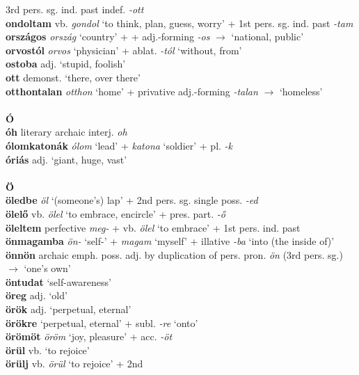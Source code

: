 \documentclass[11pt]{article}
\begin{document}
3rd pers. sg. ind. past indef. \emph{-ott} \\
\textbf{ondoltam} vb. \emph{gondol} `to think, plan, guess, worry' +
1st pers. sg. ind. past \emph{-tam} \\
\textbf{országos} \emph{ország} `country' + + adj.\hyp{}forming \emph{-os}
$\rightarrow$ `national, public' \\
\textbf{orvostól} \emph{orvos} `physician' + ablat. \emph{-tól}
`without, from' \\
\textbf{ostoba} adj. `stupid, foolish' \\
\textbf{ott} demonst. `there, over there' \\
\textbf{otthontalan} \emph{otthon} `home' + privative
adj.\hyp{}forming \emph{-talan} $\rightarrow$ `homeless' \\
\ \\
\noindent \textbf{\large Ó} \\
\textbf{óh} literary archaic interj. \emph{oh} \\
\textbf{ólomkatonák} \emph{ólom} `lead' + \emph{katona} `soldier' +
pl. \emph{-k} \\
\textbf{óriás} adj. `giant, huge, vast' \\
\ \\
\noindent \textbf{\large Ö} \\
\textbf{öledbe} \emph{öl} `(someone's) lap' + 2nd pers. sg. single
poss. \emph{-ed} \\
\textbf{ölelő} vb. \emph{ölel} `to
embrace, encircle' + pres. part. \emph{-ő} \\
\textbf{öleltem} perfective \emph{meg-} + vb. \emph{ölel} `to
embrace' + 1st pers. ind. past \\
\textbf{önmagamba} \emph{ön-} `self-' + \emph{magam} `myself' +
illative \emph{-ba} `into (the inside of)' \\
\textbf{önnön} archaic emph. poss. adj. by duplication of
pers. pron. \emph{ön} (3rd pers. sg.) $\rightarrow$ `one's own' \\
\textbf{öntudat} `self-awareness' \\
\textbf{öreg} adj. `old' \\
\textbf{örök} adj. `perpetual, eternal' \\
\textbf{örökre} `perpetual, eternal' + subl. \emph{-re} `onto' \\
\textbf{örömöt} \emph{öröm} `joy, pleasure' + acc. \emph{-öt} \\
\textbf{örül} vb. `to rejoice' \\
\textbf{örülj} vb. \emph{örül} `to rejoice' + 2nd
\end{document}
